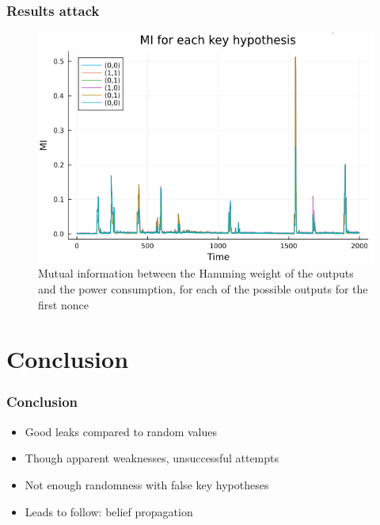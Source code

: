 \documentclass{beamer}
\begin{document}
	
	\begin{frame}
		\frametitle{Results attack}
		\begin{figure}[h]
			\centering
			\includegraphics[scale=0.3]{img_files/nonces_alea}
			\caption{Mutual information between the Hamming weight of the outputs and the power consumption, for each of the possible outputs for the first nonce}
			\label{all_alea}
		\end{figure}
	\end{frame}
	
	\section{Conclusion}
	\begin{frame}
		\frametitle{Conclusion}
		\begin{itemize}
			\item Good leaks compared to random values
			\item Though apparent weaknesses, unsuccessful attempts
			\item Not enough randomness with false key hypotheses
			\item Leads to follow: belief propagation
		\end{itemize}
	\end{frame}
	
\end{document}
